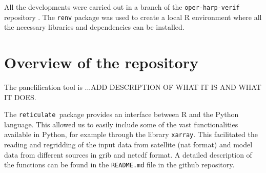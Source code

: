 \documentclass[11pt,a4paper]{article}
\newcommand{\retis}{\texttt{reticulate }}
\newcommand {\sectionrule}{\vskip -0.9 cm
\color {mygray} \rule [0 cm] {17 cm}{0.1 mm} \color {black}}
\begin{document}
All the developments were carried out in a branch of the \texttt{oper-harp-verif} repository \cite{oper-harp}.
The \texttt{renv} package was used to create a local R environment where all
the necessary libraries and dependencies can be installed.

\section{Overview of the repository}

The panelification tool is ...ADD DESCRIPTION OF WHAT IT IS AND WHAT IT DOES.

The \retis package provides an interface between R and the Python language.
This allowed us to easily include some of the vast functionalities available
in Python, for example through the library \texttt{xarray}. This facilitated
the reading and regridding of the input data from satellite (nat format)
and model data from different sources in grib and netcdf format.
A detailed description of the functions can be found in the \texttt{README.md} file
in the github repository. 
\end{document}
